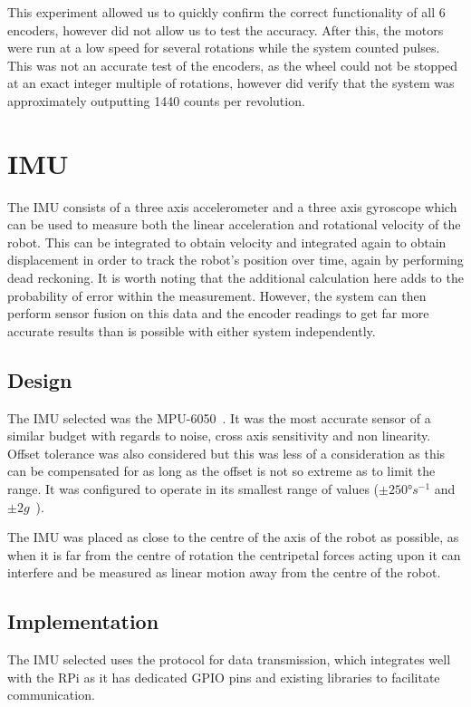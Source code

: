 This experiment allowed us to quickly confirm the correct functionality
of all 6 encoders, however did not allow us to test the accuracy. After
this, the motors were run at a low speed for several rotations while the
system counted pulses. This was not an accurate test of the encoders, as
the wheel could not be stopped at an exact integer multiple of rotations,
however did verify that the system was approximately outputting 1440
counts per revolution.

\section{IMU}\label{elec/imu}
The IMU consists of a three axis accelerometer and a three axis gyroscope
which can be used to measure both the linear acceleration and rotational
velocity of the robot. This can be integrated to obtain velocity and integrated again
to obtain displacement in order to track the robot's position over time, again by performing dead reckoning. It is worth noting
that the additional calculation here adds to the probability of error within the measurement. However, the
system can then perform sensor fusion on this data and the encoder
readings to get far more accurate results than is possible with either system
independently.

\subsection{Design}\label{elec/imu/design}
The IMU selected was the MPU-6050~\cite{MPU6050Datasheet}. It was the most accurate sensor of a
similar budget with regards to noise, cross axis sensitivity and non
linearity. Offset tolerance was also considered but this was less of a
consideration as this can be compensated for as long as the offset is not
so extreme as to limit the range. It was configured to operate in its
smallest range of values ($\pm\ang{250}s^{-1}$ and $\pm2g$~\cite{MPU6050Datasheet}).

The IMU was placed as close to the centre of the axis of the robot
as possible, as when it is far from the centre of rotation the centripetal
forces acting upon it can interfere and be measured as linear motion away
from the centre of the robot.

\subsection{Implementation}\label{elec/imu/impl}
The IMU selected uses the \isc{} protocol for data transmission, which
integrates well with the RPi as it has dedicated \isc{} GPIO pins and
existing libraries to facilitate communication.

